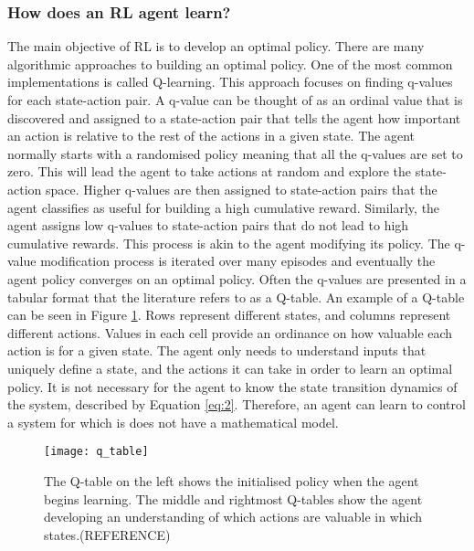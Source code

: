 \subsubsection{How does an RL agent learn?}\label{rl}
The main objective of RL is to develop an optimal policy. There are many algorithmic approaches to building an optimal policy. One of the most common implementations is called Q-learning. This approach focuses on finding q-values for each state-action pair. A q-value can be thought of as an ordinal value that is discovered and assigned to a state-action pair that tells the agent how important an action is relative to the rest of the actions in a given state. The agent normally starts with a randomised policy meaning that all the q-values are set to zero. This will lead the agent to take actions at random and explore the state-action space. Higher q-values are then assigned to state-action pairs that the agent classifies as useful for building a high cumulative reward. Similarly, the agent assigns low q-values to state-action pairs that do not lead to high cumulative rewards. This process is akin to the agent modifying its policy. The q-value modification process is iterated over many episodes and eventually the agent policy converges on an optimal policy. Often the q-values are presented in a tabular format that the literature refers to as a Q-table. An example of a Q-table can be seen in Figure \ref{fig:qtable}. Rows represent different states, and columns represent different actions. Values in each cell provide an ordinance on how valuable each action is for a given state. The agent only needs to understand inputs that uniquely define a state, and the actions it can take in order to learn an optimal policy. It is not necessary for the agent to know the state transition dynamics of the system, described by Equation \ref{eq:2}. Therefore, an agent can learn to control a system for which is does not have a mathematical model.
\begin{figure}[ht]
	\centering
	\texttt{[image: q\_table]}
	\caption{The Q-table on the left shows the initialised policy when the agent begins learning. The middle and rightmost Q-tables show the agent developing an understanding of which actions are valuable in which states.(REFERENCE)}
	\label{fig:qtable}
\end{figure}

